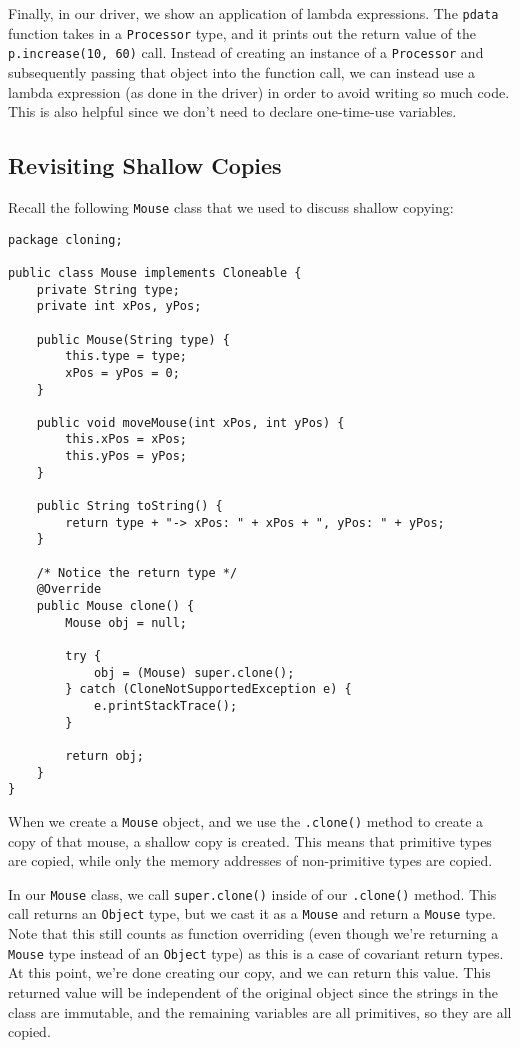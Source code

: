 Finally, in our driver, we show an application of lambda expressions. The \verb!pdata! function takes in a \verb!Processor! type, and it prints out the return value of the \verb!p.increase(10, 60)! call. Instead of creating an instance of a \verb!Processor! and subsequently passing that object into the function call, we can instead use a lambda expression (as done in the driver) in order to avoid writing so much code. This is also helpful since we don't need to declare one-time-use variables. 

\subsection{Revisiting Shallow Copies}

Recall the following \verb!Mouse! class that we used to discuss shallow copying:

\begin{lstlisting}
package cloning;

public class Mouse implements Cloneable {
	private String type;
	private int xPos, yPos;

	public Mouse(String type) {
		this.type = type;
		xPos = yPos = 0;
	}

	public void moveMouse(int xPos, int yPos) {
		this.xPos = xPos;
		this.yPos = yPos;
	}

	public String toString() {
		return type + "-> xPos: " + xPos + ", yPos: " + yPos;
	}

	/* Notice the return type */
	@Override
	public Mouse clone() {
		Mouse obj = null;

		try {
			obj = (Mouse) super.clone();
		} catch (CloneNotSupportedException e) {
			e.printStackTrace();
		}

		return obj;
	}
}
\end{lstlisting}

When we create a \verb!Mouse! object, and we use the \verb!.clone()! method to create a copy of that mouse, a shallow copy is created. This means that primitive types are copied, while only the memory addresses of non-primitive types are copied. 

In our \verb!Mouse! class, we call \verb!super.clone()! inside of our \verb!.clone()! method. This call returns an \verb!Object! type, but we cast it as a \verb!Mouse! and return a \verb!Mouse! type. Note that this still counts as function overriding (even though we're returning a \verb!Mouse! type instead of an \verb!Object! type) as this is a case of covariant return types. At this point, we're done creating our copy, and we can return this value. This returned value will be independent of the original object since the strings in the class are immutable, and the remaining variables are all primitives, so they are all copied.


